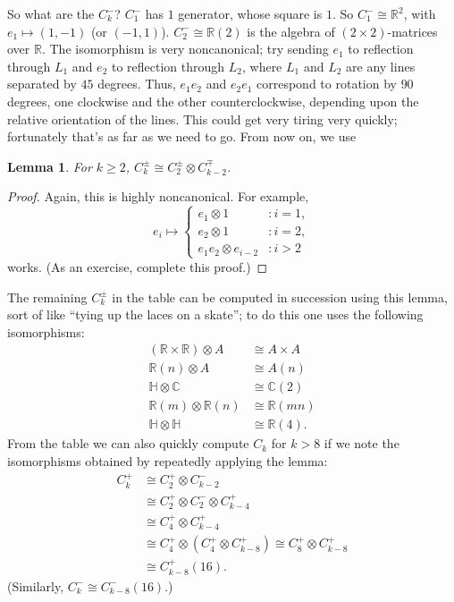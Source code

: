 \documentclass{article}
\newcommand{\C}{\mathbb{C}}
\newcommand{\R}{\mathbb{R}}
\newtheorem{lem}[thm]{Lemma}
\begin{document}
  So what are the $C_k^-$?  $C_1^-$ has $1$ generator, whose square is $1$.  So $C_1^- \cong \R^2$, with $e_1 \mapsto (1, -1)$ (or $(-1, 1)$).  $C_2^- \cong \R(2)$ is the algebra of $(2 \times 2)$-matrices over $\R$.  The isomorphism is very noncanonical; try sending %
$e_1$ to reflection through $L_1$ and $e_2$ to reflection through $L_2$, where $L_1$ and $L_2$ are any lines separated by $45$ degrees.  Thus, $e_1e_2$ and $e_2e_1$ correspond to rotation by $90$ degrees, one clockwise and the other counterclockwise, depending upon the relative orientation of the lines.  This could get very tiring very quickly; fortunately that's as far as we need to go.  From now on, we use
\begin{lem}
For $k \ge 2$, $C_k^\pm \cong C_2^\pm \otimes C_{k-2}^\mp$.
\end{lem}
\begin{proof}
Again, this is highly noncanonical.  For example,
\[
e_i \mapsto
\begin{cases}
e_1 \otimes 1 & : i = 1, \\
e_2 \otimes 1 & : i = 2, \\
e_1e_2 \otimes e_{i-2} &: i > 2
\end{cases}
\]
works.  (As an exercise, complete this proof.)
\end{proof}

The remaining $C_k^\pm$ in the table can be computed in succession using this lemma, sort of like ``tying up the laces on a skate''; to do this one uses the following isomorphisms:
\begin{align*}
(\R \times \R) \otimes A & \cong A \times A \\
\R(n) \otimes A & \cong A(n) \\
\mathbb{H} \otimes \C & \cong \C(2) \\
\R(m) \otimes \R(n) & \cong \R(mn) \\
\mathbb{H} \otimes \mathbb{H} & \cong \R(4).
\end{align*}
From the table we can also quickly compute $C_k$ for $k > 8$ if we note the isomorphisms obtained by repeatedly applying the lemma:
\begin{align*}
C_k^+ & \cong C_2^+ \otimes C_{k-2}^- \\
& \cong C_2^+ \otimes C_2^- \otimes C^+_{k-4} \\
& \cong C_4^+ \otimes C_{k-4}^+ \\
& \cong C_4^+ \otimes (C_4^+ \otimes C_{k-8}^+) \cong C_8^+ \otimes C_{k-8}^+ \\
& \cong C_{k-8}^+(16).
\end{align*}
(Similarly, $C_k^- \cong C_{k-8}^-(16)$.)
\end{document}

